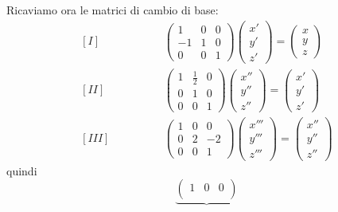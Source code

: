 \documentclass{article}     %
\begin{document}
\begin{ex}
    Ricaviamo ora le matrici di cambio di base:
    \[\begin{aligned}
        [I]\qquad \qquad &
        \begin{pmatrix}
            1&0&0\\
            -1&1&0\\
            0&0&1
        \end{pmatrix}\begin{pmatrix}
            x'\\y'\\z'
        \end{pmatrix}= \begin{pmatrix}
            x\\y\\z
        \end{pmatrix}\\
    [II]\qquad \qquad &
        \begin{pmatrix}
            1&\frac{1}{2}&0\\
            0&1&0\\
            0&0&1
        \end{pmatrix}\begin{pmatrix}
            x''\\y''\\z''
        \end{pmatrix}= \begin{pmatrix}
            x'\\y'\\z'
        \end{pmatrix}\\
    [III]\qquad \qquad &
        \begin{pmatrix}
            1&0&0\\
            0&2&-2\\
            0&0&1
        \end{pmatrix}\begin{pmatrix}
            x'''\\y'''\\z'''
        \end{pmatrix}= \begin{pmatrix}
            x''\\y''\\z''
        \end{pmatrix}
    \end{aligned}
    \]
    quindi
    \[\underbrace{\begin{pmatrix}
        1&0&0\\

\end{pmatrix}}\]
\end{ex}
\end{document}
